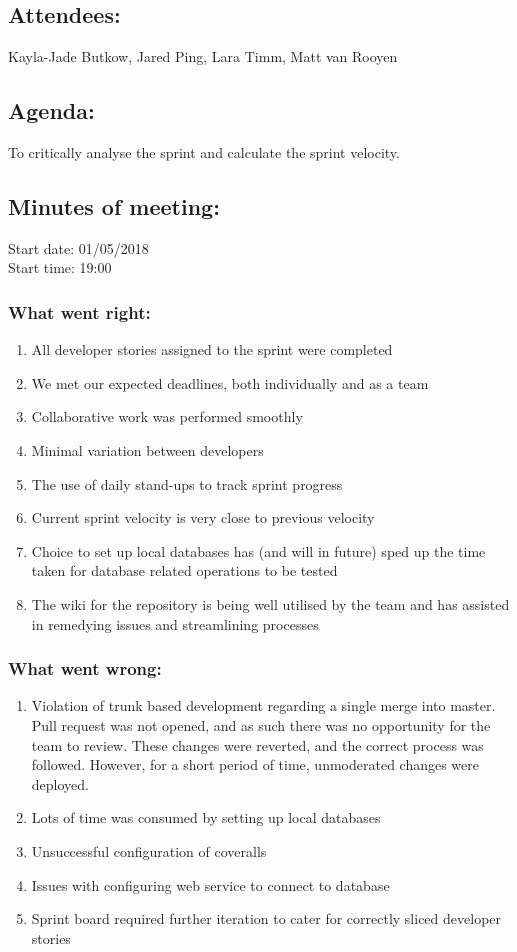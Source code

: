 \documentclass[10pt,onecolumn]{witseiepaper}
\begin{document}
\subsection*{Attendees:}
Kayla-Jade Butkow, Jared Ping, Lara Timm, Matt van Rooyen

\subsection*{Agenda:} 
To critically analyse the sprint and calculate the sprint velocity.

\subsection*{Minutes of meeting:}
Start date: 01/05/2018 \\
Start time: 19:00

\subsubsection*{What went right:}
\begin{enumerate}
	\item All developer stories assigned to the sprint were completed
	\item We met our expected deadlines, both individually and as a team
	\item Collaborative work was performed smoothly
	\item Minimal variation between developers 
	\item The use of daily stand-ups to track sprint progress
	\item Current sprint velocity is very close to previous velocity
	\item Choice to set up local databases has (and will in future) sped up the time taken for database related operations to be tested
	\item The wiki for the repository is being well utilised by the team and has assisted in remedying issues and streamlining processes
\end{enumerate}

\subsubsection*{What went wrong:}
\begin{enumerate}
	\item Violation of trunk based development regarding a single merge into master. Pull request was not opened, and as such there was no opportunity for the team to review. These changes were reverted, and the correct process was followed. However, for a short period of time, unmoderated changes were deployed.
	\item Lots of time was consumed by setting up local databases
	\item Unsuccessful configuration of coveralls
	\item Issues with configuring web service to connect to database
	\item Sprint board required further iteration to cater for correctly sliced developer stories
\end{enumerate}
\end{document}
